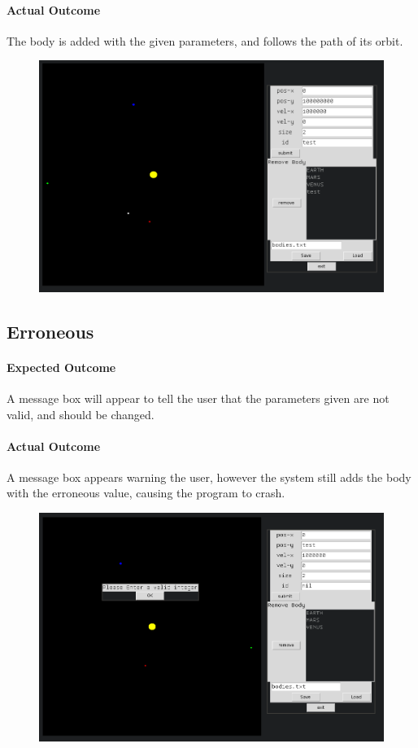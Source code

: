 \paragraph{Actual Outcome}
The body is added with the given parameters, and follows the path of its orbit.
\begin{figure}[H]
	\includegraphics[width=\textwidth]{./img/add1.png}
\end{figure}

\subsection{Erroneous}
\paragraph{Expected Outcome}
A message box will appear to tell the user that the parameters given are not
valid, and should be changed.
\paragraph{Actual Outcome}
A message box appears warning the user, however the system still adds the body
with the erroneous value, causing the program to crash.
\begin{figure}[H]
	\includegraphics[width=\textwidth]{./img/add2.png}
\end{figure}
